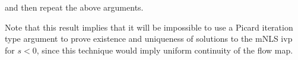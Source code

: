 and then repeat the above arguments. \qquad \qedsymbol
%
%
\begin{framed}
\begin{remark}
	Note that this result implies that it will be impossible to use a Picard
	iteration type argument to prove existence and uniqueness of solutions to the
	mNLS ivp for $s<0$, since this technique would imply uniform
	continuity of the flow map.
\end{remark}
\end{framed}
%
%

